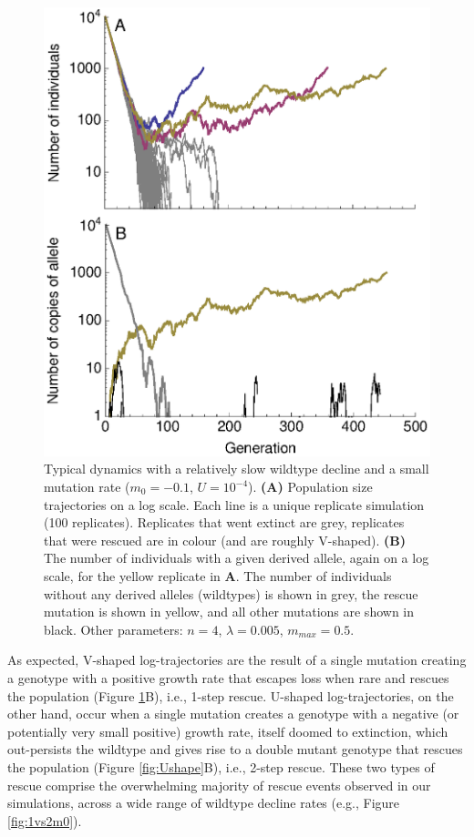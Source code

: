 \documentclass[9pt,twocolumn,twoside,lineno]{gsajnl}
\begin{document}
\begin{figure}[!h]
\centering
\includegraphics[width=\linewidth]{Figure1.eps}
\caption{
Typical dynamics with a relatively slow wildtype decline and a small mutation rate ($m_0 = -0.1$, $U=10^{-4}$).
\textbf{(A)} Population size trajectories on a log scale.
Each line is a unique replicate simulation (100 replicates).
Replicates that went extinct are grey, replicates that were rescued are in colour (and are roughly V-shaped).
\textbf{(B)} The number of individuals with a given derived allele, again on a log scale, for the yellow replicate in \textbf{A}.
The number of individuals without any derived alleles (wildtypes) is shown in grey, the rescue mutation is shown in yellow, and all other mutations are shown in black.
Other parameters: $n=4$, $\lambda=0.005$, $m_{max}=0.5$.
}%
\label{fig:Vshape}
\end{figure}

As expected, V-shaped log-trajectories are the result of a single mutation creating a genotype with a positive growth rate that escapes loss when rare and rescues the population (Figure \ref{fig:Vshape}B), i.e., 1-step rescue.
U-shaped log-trajectories, on the other hand, occur when a single mutation creates a genotype with a negative (or potentially very small positive) growth rate, itself doomed to extinction, which out-persists the wildtype and gives rise to a double mutant genotype that rescues the population (Figure \ref{fig:Ushape}B), i.e., 2-step rescue. 
These two types of rescue comprise the overwhelming majority of rescue events observed in our simulations, across a wide range of wildtype decline rates (e.g., Figure \ref{fig:1vs2m0}).
\end{document}
